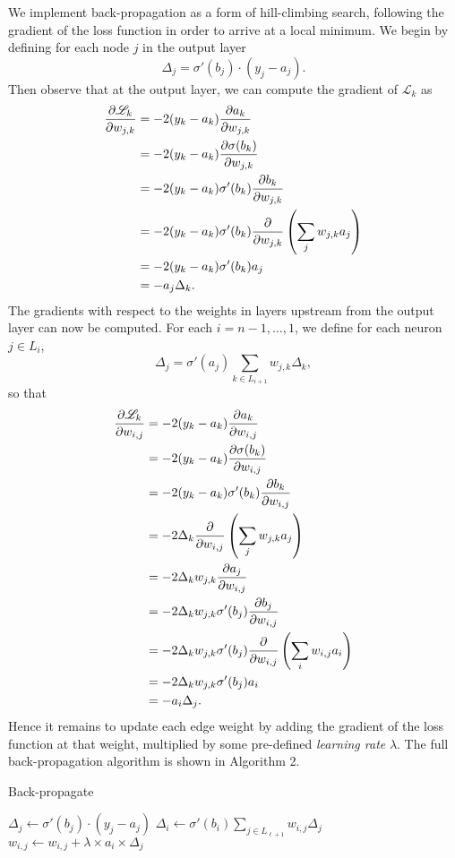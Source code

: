 \documentclass[11pt]{article}
\newcommand{\pd}[2]{\frac{\partial #1}{\partial #2}}
\begin{document}
We implement back-propagation as a form of hill-climbing search, following the gradient of the loss function in order to arrive at a local minimum. We begin by defining for each node $j$ in the output layer
\begin{equation}\Delta_j = \sigma'(b_j) \cdot (y_j-a_j).\end{equation}
Then observe that at the output layer, we can compute the gradient of $\mathscr{L}_k$ as
\begin{align}\pd{\mathscr{L}_k}{w_{j,k}} &= -2(y_k-a_k)\pd{a_k}{w_{j,k}}\notag\\
&=-2(y_k-a_k)\pd{\sigma(b_k)}{w_{j,k}}\notag\\
&=-2(y_k-a_k)\sigma'(b_k)\pd{b_k}{w_{j,k}}\notag\\
&=-2(y_k-a_k)\sigma'(b_k)\pd{}{w_{j,k}} \left(\sum_{j} w_{j,k} a_j\right)\notag\\
&=-2(y_k-a_k)\sigma'(b_k)a_j\notag\\&=-a_j \Delta_k.\end{align}
The gradients with respect to the weights in layers upstream from the output layer can now be computed. For each $i=n-1,\dots,1$, we define for each neuron $j\in L_i$,
\begin{equation}\Delta_j = \sigma'(a_j) \sum_{k\in L_{i+1}} w_{j,k} \Delta_k,\end{equation}
so that
\begin{align}\pd{\mathscr{L}_k}{w_{i,j}} &= -2(y_k-a_k)\pd{a_k}{w_{i,j}}\notag\\
&=-2(y_k-a_k)\pd{\sigma(b_k)}{w_{i,j}}\notag\\
&=-2(y_k-a_k)\sigma'(b_k)\pd{b_k}{w_{i,j}}\notag\\
&=-2\Delta_k \pd{}{w_{i,j}} \left(\sum_j w_{j,k} a_j\right)\notag\\
&=-2\Delta_k w_{j,k} \pd{a_j}{w_{i,j}}\notag\\
&=-2\Delta_k w_{j,k} \sigma'(b_j) \pd{b_j}{w_{i,j}}\notag\\
&=-2\Delta_k w_{j,k} \sigma'(b_j) \pd{}{w_{i,j}}\left(\sum_i w_{i,j} a_i\right)\notag\\
&=-2\Delta_k w_{j,k} \sigma'(b_j) a_i\notag\\
&=-a_i \Delta_j.\end{align}
Hence it remains to update each edge weight by adding the gradient of the loss function at that weight, multiplied by some pre-defined \emph{learning rate} $\lambda$. The full back-propagation algorithm is shown in Algorithm 2.

\begin{algorithm}
\caption{Back-propagate}
\begin{algorithmic}[1]
  \State $\Delta_j \gets \sigma'(b_j)\cdot (y_j-a_j)$
\EndFor
{}
    \State $\Delta_i\gets \sigma'(b_i) \sum_{j\in L_{\ell+1}} w_{i,j}\Delta_j$
  \EndFor
\EndFor
{}
  \State $w_{i,j}\gets w_{i,j} + \lambda\times a_i\times \Delta_j$
\EndFor
\EndFunction
\end{algorithmic}
\end{algorithm}
\end{document}
